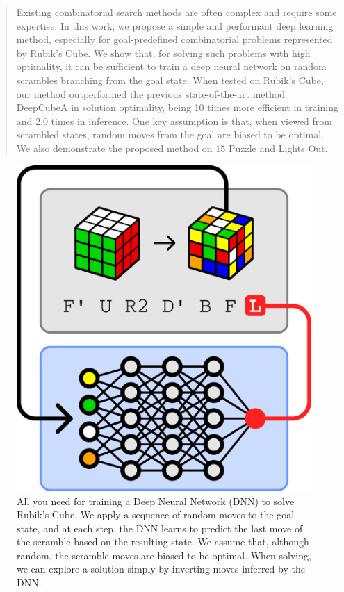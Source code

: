 \documentclass[nohyperref]{article}
\theoremstyle{plain}
\theoremstyle{definition}
\theoremstyle{remark}
\begin{document}


\printAffiliationsAndNotice{}  %

\begin{abstract}
    Existing combinatorial search methods are often complex and require some expertise.
    In this work, we propose a simple and performant deep learning method, especially for goal-predefined combinatorial problems represented by Rubik's Cube.
    We show that, for solving such problems with high optimality, it can be sufficient to train a deep neural network on random scrambles branching from the goal state.
    When tested on Rubik's Cube, our method outperformed the previous state-of-the-art method DeepCubeA in solution optimality, being 10 times more efficient in training and 2.0 times in inference.
    One key assumption is that, when viewed from scrambled states, random moves from the goal are biased to be optimal.
    We also demonstrate the proposed method on 15 Puzzle and Lights Out.
\end{abstract}

\begin{figure}[h!]
    \centering
    \includegraphics[width=0.598290598\columnwidth]{figures/overview.pdf}
    \caption{
        All you need for training a Deep Neural Network (DNN) to solve Rubik's Cube.
        We apply a sequence of random moves to the goal state, and at each step, the DNN learns to predict the last move of the scramble based on the resulting state.
        We assume that, although random, the scramble moves are biased to be optimal.
        When solving, we can explore a solution simply by inverting moves inferred by the DNN.
    }
    \label{fig:overview}
\end{figure}
\end{document}
